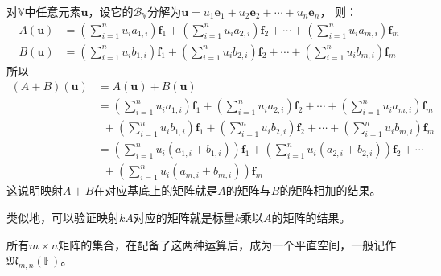 \documentclass[12pt,UTF8,fontset=none]{ctexbook}
\begin{document}
对$\mathbb{V}$中任意元素$\mathbf{u}$，设它的$\mathcal{B}_\mathbb{V}$分解为$\mathbf{u} = u_1 \mathbf{e}_1 + u_2 \mathbf{e}_2 + \cdots + u_n\mathbf{e}_n$，
则：
\begin{align*}
    A(\mathbf{u}) &= \left(\sum_{i=1}^n u_i a_{1,i}\right) \mathbf{f}_1 + \left(\sum_{i=1}^n u_i a_{2,i}\right) \mathbf{f}_2 + \cdots + \left(\sum_{i=1}^n u_i a_{m,i}\right) \mathbf{f}_m  \\
    B(\mathbf{u}) &= \left(\sum_{i=1}^n u_i b_{1,i}\right) \mathbf{f}_1 + \left(\sum_{i=1}^n u_i b_{2,i}\right) \mathbf{f}_2 + \cdots + \left(\sum_{i=1}^n u_i b_{m,i}\right) \mathbf{f}_m 
\end{align*}
所以
\begin{align*}
    (A+B)(\mathbf{u}) &= A(\mathbf{u}) + B(\mathbf{u})  \\
    &= \left(\sum_{i=1}^n u_i a_{1,i}\right) \mathbf{f}_1 + \left(\sum_{i=1}^n u_i a_{2,i}\right) \mathbf{f}_2 + \cdots + \left(\sum_{i=1}^n u_i a_{m,i}\right) \mathbf{f}_m  \\
    & \,\,\,+ \left(\sum_{i=1}^n u_i b_{1,i}\right) \mathbf{f}_1 + \left(\sum_{i=1}^n u_i b_{2,i}\right) \mathbf{f}_2 + \cdots + \left(\sum_{i=1}^n u_i b_{m,i}\right) \mathbf{f}_m  \\
    &= \left(\sum_{i=1}^n u_i (a_{1,i} + b_{1,i}) \right) \mathbf{f}_1 + \left(\sum_{i=1}^n u_i (a_{2,i} + b_{2,i})\right) \mathbf{f}_2 + \cdots  \\
    & \,\,\,+ \left(\sum_{i=1}^n u_i (a_{m,i} + b_{m,i})\right) \mathbf{f}_m  
\end{align*}
这说明映射$A+B$在对应基底上的矩阵就是$A$的矩阵与$B$的矩阵相加的结果。

类似地，可以验证映射$kA$对应的矩阵就是标量$k$乘以$A$的矩阵的结果。

所有$m\times n$矩阵的集合，在配备了这两种运算后，成为一个平直空间，一般记作$\mathfrak{M}_{m,n}(\mathbb{F})$。
\end{document}

